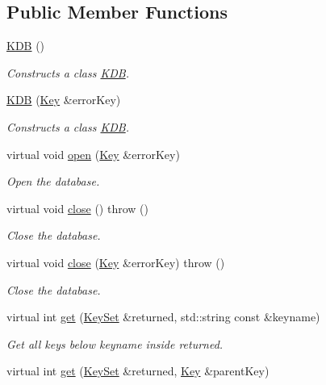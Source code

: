 \subsection*{Public Member Functions}
\begin{DoxyCompactItemize}
\item 
\hyperlink{classkdb_1_1KDB_a7e0637995ce9f294cdbc6f167df6db40}{K\+DB} ()
\begin{DoxyCompactList}\small\item\em Constructs a class \hyperlink{classkdb_1_1KDB}{K\+DB}. \end{DoxyCompactList}\item 
\hyperlink{classkdb_1_1KDB_a98e25c7fe2f47c5a90461676c6d219e7}{K\+DB} (\hyperlink{classkdb_1_1Key}{Key} \&error\+Key)
\begin{DoxyCompactList}\small\item\em Constructs a class \hyperlink{classkdb_1_1KDB}{K\+DB}. \end{DoxyCompactList}\item 
virtual void \hyperlink{classkdb_1_1KDB_aee37484b06164eacc0cc11b7b40ab892}{open} (\hyperlink{classkdb_1_1Key}{Key} \&error\+Key)
\begin{DoxyCompactList}\small\item\em Open the database. \end{DoxyCompactList}\item 
virtual void \hyperlink{classkdb_1_1KDB_a1b3ff4a68c2c935d67dce843bc4ad01b}{close} ()  throw ()
\begin{DoxyCompactList}\small\item\em Close the database. \end{DoxyCompactList}\item 
virtual void \hyperlink{classkdb_1_1KDB_aa027a8f798a2cfee11ff712eb204c35d}{close} (\hyperlink{classkdb_1_1Key}{Key} \&error\+Key)  throw ()
\begin{DoxyCompactList}\small\item\em Close the database. \end{DoxyCompactList}\item 
virtual int \hyperlink{classkdb_1_1KDB_a0419ffbc273c89756bc523b4223ec25a}{get} (\hyperlink{classkdb_1_1KeySet}{Key\+Set} \&returned, std\+::string const \&keyname)
\begin{DoxyCompactList}\small\item\em Get all keys below keyname inside returned. \end{DoxyCompactList}\item 
virtual int \hyperlink{classkdb_1_1KDB_a48770a7290699bf2b7529f3ab67e378f}{get} (\hyperlink{classkdb_1_1KeySet}{Key\+Set} \&returned, \hyperlink{classkdb_1_1Key}{Key} \&parent\+Key)

\end{DoxyCompactItemize}

